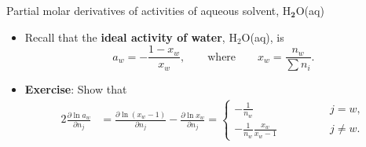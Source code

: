 %
%
\begin{frame}{Partial molar derivatives of activities of aqueous solvent, H$_{\boldsymbol{2}}$O(aq)}
%
\begin{itemize}
\item Recall that the {\bf ideal activity of water}, H$_{2}$O(aq), is
\[
a_{w}=-\frac{1-x_{w}}{x_{w}}, \qquad \text{where} \qquad 
x_{w}=\frac{n_{w}}{\sum n_{i}}.
\]
\pause
\item \alert{\bf Exercise}: Show that
%
\begin{alignat*}{2}
\tfrac{\partial\ln a_{w}}{\partial n_{j}} & 
= \tfrac{\partial\ln(x_{w}-1)}{\partial n_{j}}-\tfrac{\partial\ln x_{w}}{\partial n_{j}}=\begin{cases}
	-\tfrac{1}{n_{w}} & j=w,\\
	-\tfrac{1}{n_{w}}\tfrac{x_{w}}{x_{w}-1} \qquad \qquad & j\neq w.
\end{cases}
\end{alignat*}
%
\end{itemize}

\end{frame}
%
%
%
